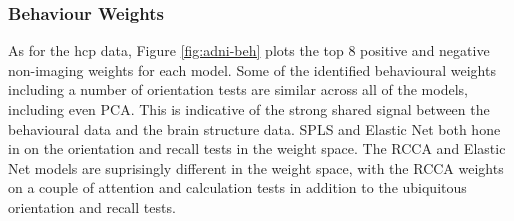 \subsubsection{Behaviour Weights}

As for the \acrshort{hcp} data, Figure \ref{fig:adni-beh} plots the top 8 positive and negative non-imaging \gls{weights} for each model.
Some of the identified behavioural \gls{weights} including a number of orientation tests are similar across all of the models, including even PCA.
This is indicative of the strong shared signal between the behavioural data and the brain structure data.
SPLS and Elastic Net both hone in on the orientation and recall tests in the weight space.
The RCCA and Elastic Net models are suprisingly different in the weight space, with the RCCA \gls{weights} on a couple of attention and calculation tests in addition to the ubiquitous orientation and recall tests.

